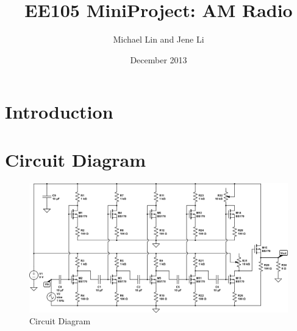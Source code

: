 \documentclass[11pt, twoside, letterpaper]{article}
\title{EE105 MiniProject: AM Radio}
\author{Michael Lin and Jene Li}
\date{December 2013}
\begin{document}
\maketitle

\section{Introduction}
\newpage

\section{Circuit Diagram}
\begin{figure}[htbp]
	\begin{center}
		\includegraphics[scale=0.8,angle=-90]{circuitdiagram.png}
		\caption{Circuit Diagram}
	\end{center}
\end{figure}
\FloatBarrier
\newpage
\end{document}
